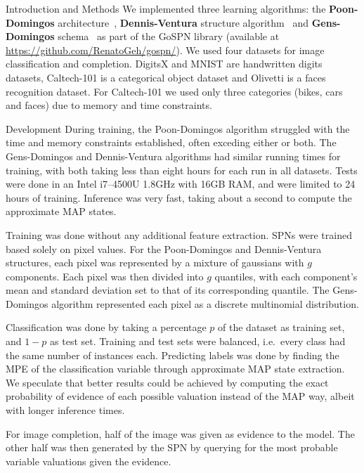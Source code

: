 \documentclass[final,hyperref={pdfpagelabels=false},notheorems]{beamer}
\theoremstyle{thesisstyle}
\newcommand{\pskip}{\vskip 0.5cm}
\begin{document}
\begin{frame}[t]
\begin{columns}[t]
\begin{column}{.5225\textwidth}
\begin{block}{Introduction and Methods}
      We implemented three learning algorithms: the \textbf{Poon-Domingos}
      architecture~\cite{poon-domingos}, \textbf{Dennis-Ventura} structure algorithm~\cite{clustering} and
      \textbf{Gens-Domingos} schema~\cite{gens-domingos} as part of the GoSPN library (available at
      \url{https://github.com/RenatoGeh/gospn/}). We used four datasets for image classification
      and completion. DigitsX and MNIST are handwritten digits datasets, Caltech-101 is a
      categorical object dataset and Olivetti is a faces recognition dataset. For Caltech-101 we
      used only three categories (bikes, cars and faces) due to memory and time constraints.
    \end{block}

    \begin{block}{Development}
      During training, the Poon-Domingos algorithm struggled with the time and memory constraints
      established, often exceding either or both. The Gens-Domingos and Dennis-Ventura algorithms
      had similar running times for training, with both taking less than eight hours for each run
      in all datasets. Tests were done in an Intel i7--4500U 1.8GHz with 16GB RAM, and were limited
      to 24 hours of training. Inference was very fast, taking about a second to compute the
      approximate MAP states.\pskip

      Training was done without any additional feature extraction. SPNs were trained based solely
      on pixel values. For the Poon-Domingos and Dennis-Ventura structures, each pixel was
      represented by a mixture of gaussians with $g$ components. Each pixel was then divided into
      $g$ quantiles, with each component's mean and standard deviation set to that of its
      corresponding quantile. The Gens-Domingos algorithm represented each pixel as a discrete
      multinomial distribution.\pskip

      Classification was done by taking a percentage $p$ of the dataset as training set, and $1-p$
      as test set. Training and test sets were balanced, i.e.\ every class had the same number of
      instances each. Predicting labels was done by finding the MPE of the classification variable
      through approximate MAP state extraction. We speculate that better results could be achieved
      by computing the exact probability of evidence of each possible valuation instead of the MAP
      way, albeit with longer inference times.\pskip

      For image completion, half of the image was given as evidence to the model. The other half
      was then generated by the SPN by querying for the most probable variable valuations given the
      evidence.
    \end{block}


\end{column}
\end{columns}
\end{frame}
\end{document}
